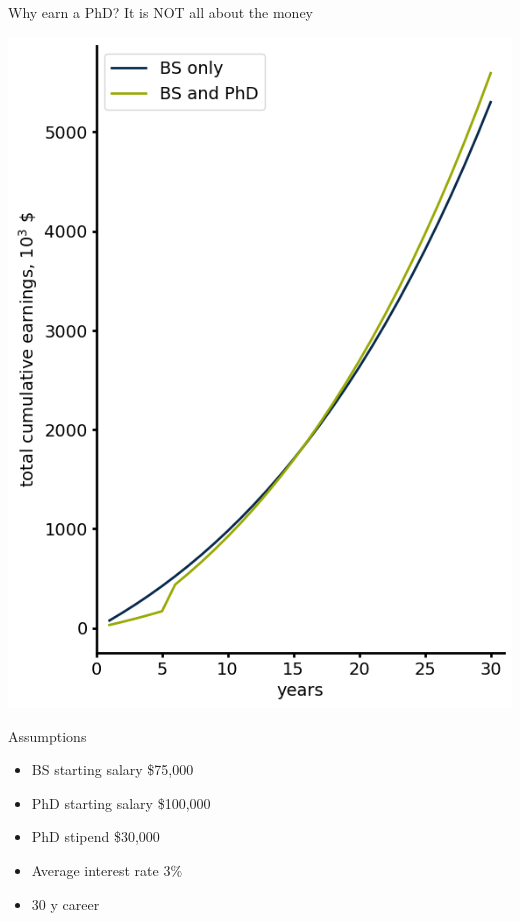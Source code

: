 \begin{frame}[fragile]{Why earn a PhD? It is NOT all about the money}

\begin{minipage}{0.45\textwidth}
    \includegraphics[width=\textwidth]{money}
\end{minipage}\hspace{0.08\textwidth}
\begin{minipage}{0.45\textwidth}
Assumptions
    \begin{itemize}
            \item BS starting salary \$75,000
            \item PhD starting salary \$100,000
            \item PhD stipend \$30,000
            \item Average interest rate 3\%
            \item 30 y career
    \end{itemize}
\end{minipage}
\end{frame}

